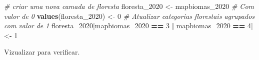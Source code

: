 \documentclass[
]{article}
\newenvironment{Shaded}{\begin{snugshade}}{\end{snugshade}}
\newcommand{\CommentTok}[1]{\textcolor[rgb]{0.56,0.35,0.01}{\textit{#1}}}
\newcommand{\DecValTok}[1]{\textcolor[rgb]{0.00,0.00,0.81}{#1}}
\newcommand{\FunctionTok}[1]{\textcolor[rgb]{0.13,0.29,0.53}{\textbf{#1}}}
\newcommand{\NormalTok}[1]{#1}
\newcommand{\OtherTok}[1]{\textcolor[rgb]{0.56,0.35,0.01}{#1}}
\newcommand{\SpecialCharTok}[1]{\textcolor[rgb]{0.81,0.36,0.00}{\textbf{#1}}}
\begin{document}
\begin{Shaded}
\begin{Highlighting}[]
\CommentTok{\# criar uma nova camada de floresta}
\NormalTok{floresta\_2020 }\OtherTok{\textless{}{-}}\NormalTok{ mapbiomas\_2020}
\CommentTok{\# Com valor de 0}
\FunctionTok{values}\NormalTok{(floresta\_2020) }\OtherTok{\textless{}{-}} \DecValTok{0}
\CommentTok{\# Atualizar categorias florestais agrupados com valor de 1}
\NormalTok{floresta\_2020[mapbiomas\_2020 }\SpecialCharTok{==} \DecValTok{3} \SpecialCharTok{|}\NormalTok{ mapbiomas\_2020 }\SpecialCharTok{==} \DecValTok{4}\NormalTok{] }\OtherTok{\textless{}{-}} \DecValTok{1} 
\end{Highlighting}
\end{Shaded}

\newpage

Vizualizar para verificar.
\end{document}
